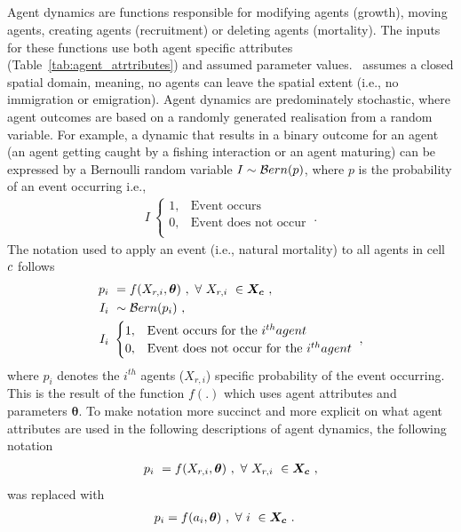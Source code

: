 \subsection{}\label{sec:process}
Agent dynamics are functions responsible for modifying agents (growth), moving agents, creating agents (recruitment) or deleting agents (mortality). The inputs for these functions use both agent specific attributes (Table~\ref{tab:agent_atrtributes}) and assumed parameter values. \IBM\ assumes a closed spatial domain, meaning, no agents can leave the spatial extent (i.e., no immigration or emigration). Agent dynamics are predominately stochastic, where agent outcomes are based on a randomly generated realisation from a random variable. For example, a dynamic that results in a binary outcome for an agent (an agent getting caught by a fishing interaction or an agent maturing) can be expressed by a Bernoulli random variable \(I\sim\mathcal{B}ern(p)\), where \(p\) is the probability of an event occurring i.e.,
\begin{align*}\label{eg:bernoulli}
I \ 
\begin{cases}
1,& \text{Event occurs} \\
0,& \text{Event does not occur} \\	
\end{cases}  \ .
\end{align*}
%
The notation used to apply an event (i.e., natural mortality) to all agents in cell \(c\) follows
\begin{align*}
p_i \ &= f(X_{r,i}, \bm{\theta}) \ , \ \forall \ X_{r,i} \ \in \bm{X_c} \ , \\
I_i \ &\sim\mathcal{B}ern(p_i)\ ,\\
I_i \ &
\begin{cases}
1,& \text{Event occurs for the }i^{th}{ agent}\\
0,& \text{Event does not occur for the }i^{th}{ agent}
\end{cases} \ ,
\end{align*} 
%
where \(p_i\) denotes the \(i^{th}\) agents (\(X_{r,i}\)) specific probability of the event occurring. This is the result of the function \(f(.)\) which uses agent attributes and parameters \(\bm{\theta}\). To make notation more succinct and more explicit on what agent attributes are used in the following descriptions of agent dynamics, the following notation
\begin{align*}
p_i \ &= f(X_{r,i}, \bm{\theta}) \ , \ \forall \ X_{r,i} \ \in \bm{X_c} \ , \\
\end{align*} 
%
was replaced with 
%
\begin{align*}
p_i &= f(a_i, \bm{\theta}) \ , \ \forall \ i \ \in \bm{X_c} \ .
\end{align*} 

